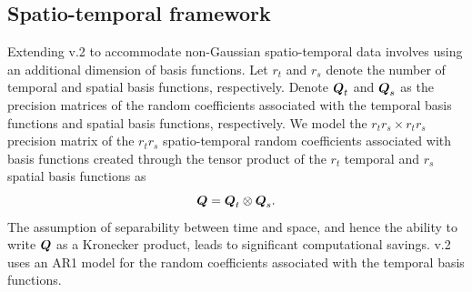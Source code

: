\documentclass[nojss]{jss}
\def\mbf#1{{%
\mathchoice%
{\hbox{\boldmath$\displaystyle{#1}$}}%
{\hbox{\boldmath$\textstyle{#1}$}}%
{\hbox{\boldmath$\scriptstyle{#1}$}}%
{\hbox{\boldmath$\scriptscriptstyle{#1}$}}%
}}
\def\vec{\mbf}
\newcommand{\tp}{{\!\scriptscriptstyle \top}}
\begin{document}


\subsection{Spatio-temporal framework}\label{sec:spatio-temporal}

Extending  v.2 to accommodate non-Gaussian spatio-temporal data involves using an additional dimension of basis functions.
Let $r_t$ and $r_s$ denote the number of temporal and spatial basis functions, respectively. 
Denote $\vec{Q}_t$ and $\vec{Q}_s$ as the precision matrices of the random coefficients associated with the temporal basis functions and spatial basis functions, respectively. 
We model the $r_tr_s \times r_tr_s$ precision matrix  of the $r_tr_s$ spatio-temporal random coefficients associated with basis functions created through the tensor product of the $r_t$ temporal and $r_s$ spatial basis functions as
\[
\vec{Q} = \vec{Q}_t \otimes \vec{Q}_s.
\]
The assumption of separability between time and space, and hence the ability to write $\vec{Q}$ as a Kronecker product, leads to significant computational savings. 
 v.2 uses an AR1 model for the random coefficients associated with the temporal basis functions.
\end{document}
